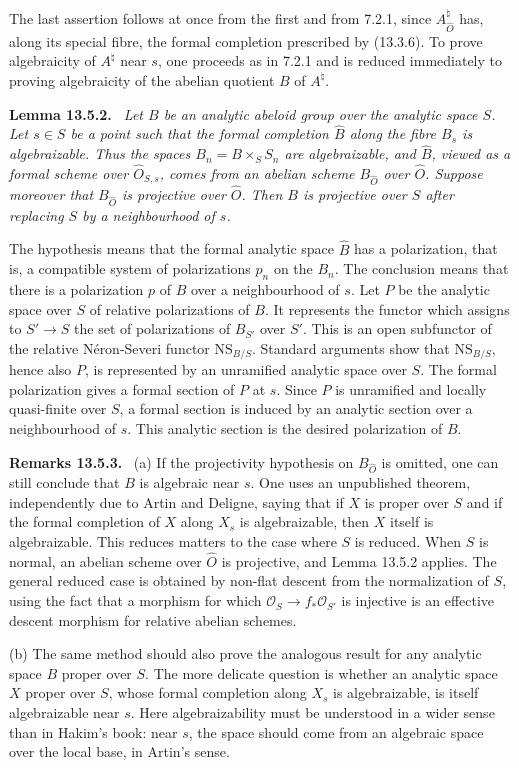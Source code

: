 \documentclass[12pt]{article}
\providecommand{\cO}{\mathcal O}
\newenvironment{statement}[1]{\par\medskip\noindent\textbf{#1.}\itshape\ }{\par\medskip}
\newenvironment{remarktext}[1]{\par\medskip\noindent\textbf{#1.}\ }{\par\medskip}
\begin{document}
The last assertion follows at once from the first and from 7.2.1, since $A^{\natural}_{\widehat O}$ has, along its special fibre, the formal completion prescribed by (13.3.6).  To prove algebraicity of $A^{\natural}$ near $s$, one proceeds as in 7.2.1 and is reduced immediately to proving algebraicity of the abelian quotient $B$ of $A^{\natural}$.

\begin{statement}{Lemma 13.5.2}
Let $B$ be an analytic abeloid group over the analytic space $S$.  Let $s\in S$ be a point such that the formal completion $\widehat B$ along the fibre $B_s$ is algebraizable.  Thus the spaces $B_n=B\times_S S_n$ are algebraizable, and $\widehat B$, viewed as a formal scheme over $\widehat O_{S,s}$, comes from an abelian scheme $B_{\widehat O}$ over $\widehat O$.  Suppose moreover that $B_{\widehat O}$ is projective over $\widehat O$.  Then $B$ is projective over $S$ after replacing $S$ by a neighbourhood of $s$.
\end{statement}

The hypothesis means that the formal analytic space $\widehat B$ has a polarization, that is, a compatible system of polarizations $p_n$ on the $B_n$.  The conclusion means that there is a polarization $p$ of $B$ over a neighbourhood of $s$.  Let $P$ be the analytic space over $S$ of relative polarizations of $B$.  It represents the functor which assigns to $S'\to S$ the set of polarizations of $B_{S'}$ over $S'$.  This is an open subfunctor of the relative N\'eron-Severi functor $\mathrm{NS}_{B/S}$.  Standard arguments show that $\mathrm{NS}_{B/S}$, hence also $P$, is represented by an unramified analytic space over $S$.  The formal polarization gives a formal section of $P$ at $s$.  Since $P$ is unramified and locally quasi-finite over $S$, a formal section is induced by an analytic section over a neighbourhood of $s$.  This analytic section is the desired polarization of $B$.

\begin{remarktext}{Remarks 13.5.3}
(a)  If the projectivity hypothesis on $B_{\widehat O}$ is omitted, one can still conclude that $B$ is algebraic near $s$.  One uses an unpublished theorem, independently due to Artin and Deligne, saying that if $X$ is proper over $S$ and if the formal completion of $X$ along $X_s$ is algebraizable, then $X$ itself is algebraizable.  This reduces matters to the case where $S$ is reduced.  When $S$ is normal, an abelian scheme over $\widehat O$ is projective, and Lemma 13.5.2 applies.  The general reduced case is obtained by non-flat descent from the normalization of $S$, using the fact that a morphism for which $\cO_S\to f_*\cO_{S'}$ is injective is an effective descent morphism for relative abelian schemes.

(b)  The same method should also prove the analogous result for any analytic space $B$ proper over $S$.  The more delicate question is whether an analytic space $X$ proper over $S$, whose formal completion along $X_s$ is algebraizable, is itself algebraizable near $s$.  Here algebraizability must be understood in a wider sense than in Hakim's book: near $s$, the space should come from an algebraic space over the local base, in Artin's sense.
\end{remarktext}
\end{document}

